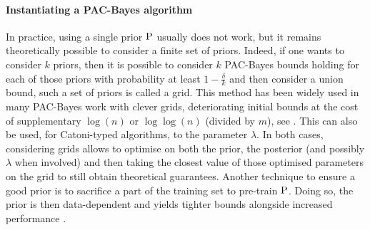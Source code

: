 \paragraph{Instantiating a PAC-Bayes algorithm}
  In practice, using a single prior $\P$ usually does not work, but it remains theoretically possible to consider a finite set of priors. Indeed, if one wants to consider $k$ priors, then it is possible to consider $k$ PAC-Bayes bounds holding for each of those priors with probability at least $1-\frac{\delta}{k}$ and then consider a union bound, such a set of priors is called a grid. This method has been widely used in many PAC-Bayes work with clever grids, deteriorating initial bounds at the cost of supplementary $\log(n)$ or $\log\log(n)$ (divided by $m$), see \eg \citet{alquier2024user}. 
  This can also be used, for Catoni-typed algorithms, to the parameter $\lambda$. In both cases, considering grids allows to optimise on both the prior, the posterior (and possibly $\lambda$ when involved) and then taking the closest value of those optimised parameters on the grid to still obtain theoretical guarantees. Another technique to ensure a good prior is to sacrifice a part of the training set to pre-train $\P$. 
  Doing so, the prior is then data-dependent and yields tighter bounds alongside increased performance \citep{perez2021tighter,perezortiz2021learning}.


